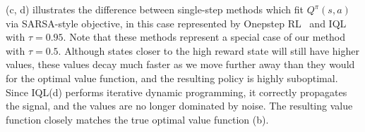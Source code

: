 \documentclass{article} %
\def\ourname{IQL\xspace}
\begin{document}
 (c, d) %
illustrates the difference between single-step methods which fit $Q^\pi(s,a)$ via SARSA-style objective, in this case represented by 
Onepstep RL~\citep{brandfonbrener2021offline, wang2018exponentially, gulcehre2021regularized} and \ourname with $\tau=0.95$. Note that these methods represent a special case of our method with $\tau=0.5$.
Although states closer to the high reward state will still have higher values, these values decay much faster as we move further away than they would for the optimal value function, and the resulting policy is highly suboptimal.
Since \ourname (d) performs iterative dynamic programming, it correctly propagates the signal, and the values are no longer dominated by noise. The resulting value function closely matches the true optimal value function (b).
\end{document}
